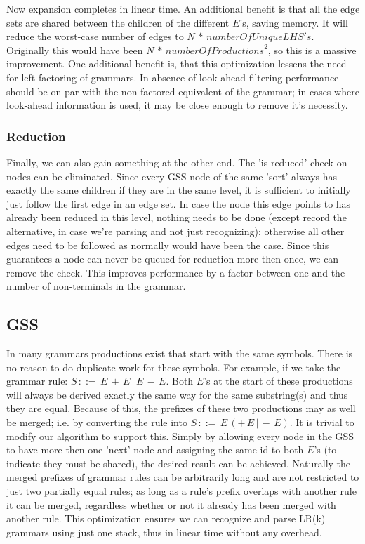 \documentclass[a4paper,10pt]{article}
\begin{document}
Now expansion completes in linear time. An additional benefit is that all the edge sets are shared between the children of the different $E$'s, saving memory. It will reduce the worst-case number of edges to $N\,*\,\mathit{numberOfUniqueLHS's}$. Originally this would have been $N\,*\,\mathit{numberOfProductions}^2$, so this is a massive improvement. One additional benefit is, that this optimization lessens the need for left-factoring of grammars. In absence of look-ahead filtering performance should be on par with the non-factored equivalent of the grammar; in cases where look-ahead information is used, it may be close enough to remove it's necessity.

\subsubsection{Reduction}
Finally, we can also gain something at the other end. The 'is reduced' check on nodes can be eliminated. Since every GSS node of the same 'sort' always has exactly the same children if they are in the same level, it is sufficient to initially just follow the first edge in an edge set. In case the node this edge points to has already been reduced in this level, nothing needs to be done (except record the alternative, in case we're parsing and not just recognizing); otherwise all other edges need to be followed as normally would have been the case. Since this guarantees a node can never be queued for reduction more then once, we can remove the check. This improves performance by a factor between one and the number of non-terminals in the grammar.

\subsection{GSS}

In many grammars productions exist that start with the same symbols. There is no reason to do duplicate work for these symbols. For example, if we take the grammar rule: $S\,::=\,E\,+\,E\,|\,E\,-\,E$. Both $E$'s at the start of these productions will always be derived exactly the same way for the same substring(s) and thus they are equal. Because of this, the prefixes of these two productions may as well be merged; i.e. by converting the rule into $S\,::=\,E\,(+\,E\,|\,-\,E)$. It is trivial to modify our algorithm to support this. Simply by allowing every node in the GSS to have more then one 'next' node and assigning the same id to both $E$'s (to indicate they must be shared), the desired result can be achieved. Naturally the merged prefixes of grammar rules can be arbitrarily long and are not restricted to just two partially equal rules; as long as a rule's prefix overlaps with another rule it can be merged, regardless whether or not it already has been merged with another rule. This optimization ensures we can recognize and parse LR(k) grammars using just one stack, thus in linear time without any overhead.
\end{document}
